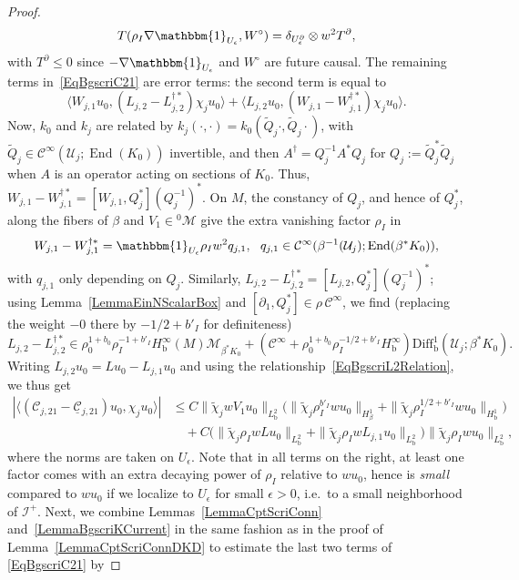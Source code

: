 \documentclass[reqno,11pt,letterpaper]{amsart}
\numberwithin{equation}{section}
\numberwithin{figure}{section}
\theoremstyle{definition}
\theoremstyle{remark}
\newcommand{\mc}{\mathcal}
\newcommand{\cC}{\mc C}
\newcommand{\cM}{\mc M}
\newcommand{\cU}{\mc U}
\newcommand{\ms}{\mathscr}
\newcommand{\scri}{\ms I}
\newcommand{\one}{\mathbbm{1}}
\newcommand{\End}{\operatorname{End}}
\newcommand{\eps}{\epsilon}
\newcommand{\la}{\langle}
\newcommand{\pa}{\partial}
\newcommand{\ra}{\rangle}
\newcommand{\ul}[1]{\underline{#1}{}}
\newcommand{\wt}{\widetilde}
\newcommand{\bop}{{\mathrm{b}}}
\newcommand{\Diff}{\mathrm{Diff}}
\newcommand{\Diffb}{\Diff_\bop}
\newcommand{\CI}{\cC^\infty}
\newcommand{\Hb}{H_{\bop}}
\newcommand{\Hbeta}{H_{\beta}}
\begin{document}
\begin{proof}
  \[
    T(\rho_I\nabla\one_{U_\eps},W^\circ) = \delta_{U_\eps^\pa}\otimes w^2 T^\pa,
  \]
  with $T^\pa\leq 0$ since $-\nabla\one_{U_\eps}$ and $W^\circ$ are future causal. The remaining terms in~\eqref{EqBgscriC21} are error terms: the second term is equal to
  \[
    \la W_{j,1}u_0,(L_{j,2}-L_{j,2}^{\dag*})\chi_j u_0\ra + \la L_{j,2} u_0, (W_{j,1}-W_{j,1}^{\dag*})\chi_j u_0\ra.
  \]
  Now, $k_0$ and $k_j$ are related by $k_j(\cdot,\cdot)=k_0(\wt Q_j\cdot,\wt Q_j\cdot)$, with $\wt Q_j\in\CI(\cU_j;\End(K_0))$ invertible, and then $A^\dag=Q_j^{-1}A^*Q_j$ for $Q_j:=\wt Q_j^*\wt Q_j$ when $A$ is an operator acting on sections of $K_0$. Thus, $W_{j,1}-W_{j,1}^{\dag *}=[W_{j,1},Q_j^*](Q_j^{-1})^*$. On $M$, the constancy of $Q_j$, and hence of $Q_j^*$, along the fibers of $\beta$ and $V_1\in{}^0\cM$ give the extra vanishing factor $\rho_I$ in
  \[
    W_{j,1}-W_{j,1}^{\dag *} = \one_{U_\eps}\rho_I w^2 q_{j,1},\ \ 
    q_{j,1}\in \CI(\beta^{-1}(\cU_j);\End(\beta^*K_0)),
  \]
  with $q_{j,1}$ only depending on $Q_j$. Similarly, $L_{j,2}-L_{j,2}^{\dag *}=[L_{j,2},Q_j^*](Q_j^{-1})^*$; using Lemma~\ref{LemmaEinNScalarBox} and $[\pa_1,Q_j^*]\in\rho\,\CI$, we find (replacing the weight $-0$ there by $-1/2+b'_I$ for definiteness)
  \begin{equation}
  \label{EqBgscriLj2Adj}
    L_{j,2}-L_{j,2}^{\dag *} \in \rho_0^{1+b_0}\rho_I^{-1+b'_I}\Hb^\infty(M)\cM_{\beta^*K_0} + (\CI+\rho_0^{1+b_0}\rho_I^{-1/2+b'_I}\Hb^\infty)\Diffb^1(\cU_j;\beta^*K_0).
  \end{equation}
  Writing $L_{j,2}u_0=L u_0-L_{j,1}u_0$ and using the relationship~\eqref{EqBgscriL2Relation}, we thus get
  \begin{equation}
  \label{EqBgscriC21DiffEst}
  \begin{split}
    |\la(\cC_{j,2 1}-\ul\cC_{j,2 1})u_0,\chi_j u_0\ra| &\leq C\|\wt\chi_j w V_1 u_0\|_{L^2_\bop} \bigl(\|\wt\chi_j\rho_I^{b'_I}w u_0\|_{\Hbeta^1} + \|\wt\chi_j\rho_I^{1/2+b'_I}w u_0\|_{\Hb^1}\bigr) \\
      &\quad + C\bigl(\|\wt\chi_j\rho_I w L u_0\|_{L^2_\bop} + \|\wt\chi_j\rho_I w L_{j,1}u_0\|_{L^2_\bop}\bigr) \| \wt\chi_j \rho_I w u_0\|_{L^2_\bop},
  \end{split}
  \end{equation}
  where the norms are taken on $U_\eps$. Note that in all terms on the right, at least one factor comes with an extra decaying power of $\rho_I$ relative to $w u_0$, hence is \emph{small} compared to $w u_0$ if we localize to $U_\eps$ for small $\eps>0$, i.e.\ to a small neighborhood of $\scri^+$. Next, we combine Lemmas~\ref{LemmaCptScriConn} and~\ref{LemmaBgscriKCurrent} in the same fashion as in the proof of Lemma~\ref{LemmaCptScriConnDKD} to estimate the last two terms of \eqref{EqBgscriC21} by

\end{proof}
\end{document}
